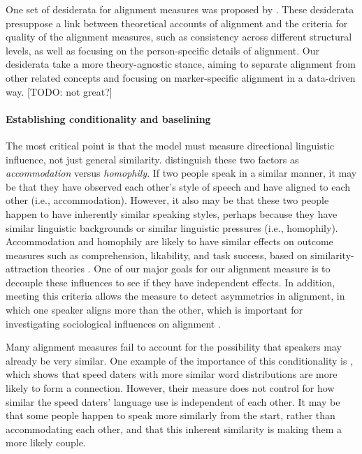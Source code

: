 \documentclass{acm_proc_article-sp}
\begin{document}
One set of desiderata for alignment measures was proposed by \cite{XuReitter2015}.  These desiderata presuppose a link between theoretical accounts of alignment and the criteria for quality of the alignment measures, such as consistency across different structural levels, as well as focusing on the person-specific details of alignment.  Our desiderata take a more theory-agnostic stance, aiming to separate alignment from other related concepts and focusing on marker-specific alignment in a data-driven way. [TODO: not great?]

\paragraph{Establishing conditionality and baselining} The most critical point is that the model must measure directional linguistic influence, not just general similarity. \cite{DNMGamonDumais2011} distinguish these two factors as \textit{accommodation} versus \textit{homophily}.  If two people speak in a similar manner, it may be that they have observed each other's style of speech and have aligned to each other (i.e., accommodation). However, it also may be that these two people happen to have inherently similar speaking styles, perhaps because they have similar linguistic backgrounds or similar linguistic pressures (i.e., homophily). Accommodation and homophily are likely to have similar effects on outcome measures such as comprehension, likability, and task success, based on similarity-attraction theories \cite{Byrne1969,Triandis1960,GilesSmith1979}.  One of our major goals for our alignment measure is to decouple these influences to see if they have independent effects.  In addition, meeting this criteria allows the measure to detect asymmetries in alignment, in which one speaker aligns more than the other, which is important for investigating sociological influences on alignment \cite{DNMEtAl2012}.

Many alignment measures fail to account for the possibility that speakers may already be very similar.  One example of the importance of this conditionality is \cite{IrelandEtAl2011}, which shows that speed daters with more similar word distributions are more likely to form a connection. However, their measure does not control for how similar the speed daters' language use is independent of each other.  It may be that some people happen to speak more similarly from the start, rather than accommodating each other, and that this inherent similarity is making them a more likely couple.
\end{document}
